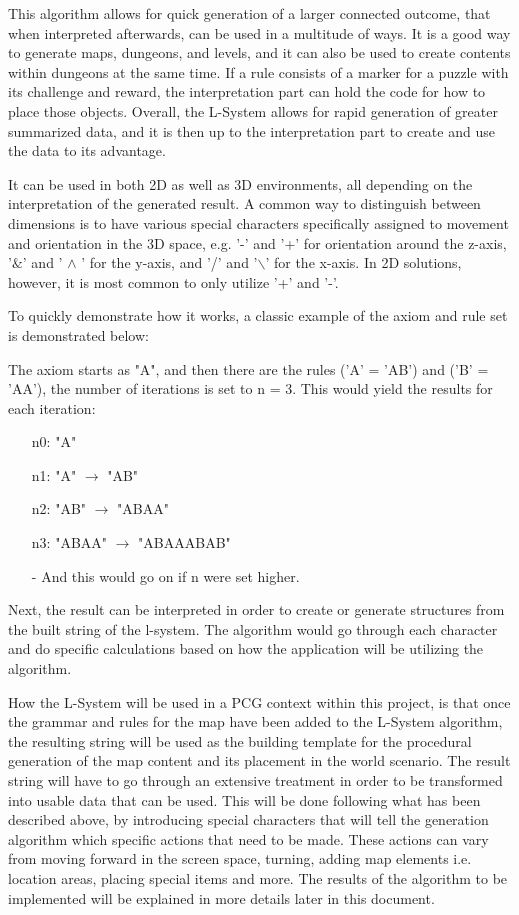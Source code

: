 This algorithm allows for quick generation of a larger connected outcome, that when interpreted afterwards, can be used in a multitude of ways. 
It is a good way to generate maps, dungeons, and levels, and it can also be used to create contents within dungeons at the same time. If a rule consists of a marker for a puzzle with its challenge and reward, the interpretation part can hold the code for how to place those objects. 
Overall, the L-System allows for rapid generation of greater summarized data, and it is then up to the interpretation part to create and use the data to its advantage.

It can be used in both 2D as well as 3D environments, all depending on the interpretation of the generated result. A common way to distinguish between dimensions is to have various special characters specifically assigned to movement and orientation in the 3D space, e.g. '-' and '+' for orientation around the z-axis, '$\&$' and ' $\wedge$ ' for the y-axis, and '/' and '$\backslash$' for the x-axis. In 2D solutions, however, it is most common to only utilize '+' and '-'. 

To quickly demonstrate how it works, a classic example of the axiom and rule set is demonstrated below:

The axiom starts as "A", and then there are the rules ('A' = 'AB') and ('B' = 'AA'), the number of iterations is set to n = 3. This would yield the results for each iteration:
\begin{itemize}
\item[n0:] "A"
\item[n1:] "A" $\rightarrow$  "AB"
\item[n2:] "AB"  $\rightarrow$ "ABAA"
\item[n3:] "ABAA"  $\rightarrow$  "ABAAABAB"
\item[-] And this would go on if n were set higher.
\end{itemize}

Next, the result can be interpreted in order to create or generate structures from the built string of the l-system. The algorithm would go through each character and do specific calculations based on how the application will be utilizing the algorithm.

How the L-System will be used in a PCG context within this project, is that once the grammar and rules for the map have been added to the L-System algorithm, the resulting string will be used as the building template for the procedural generation of the map content and its placement in the world scenario. The result string will have to go through an extensive treatment in order to be transformed into usable data that can be used. This will be done following what has been described above, by introducing special characters that will tell the generation algorithm which specific actions that need to be made. These actions can vary from moving forward in the screen space, turning, adding map elements i.e. location areas, placing special items and more. The results of the algorithm to be implemented will be explained in more details later in this document.

